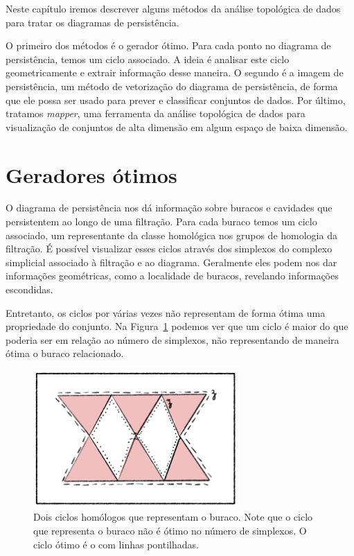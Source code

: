Neste capítulo iremos descrever alguns métodos da análise topológica de dados
para tratar os diagramas de persistência. 

O primeiro dos métodos é o
gerador ótimo. Para cada ponto no diagrama de persistência, temos um ciclo
associado. A ideia é analisar este ciclo geometricamente e extrair 
informação desse maneira. 
O segundo é a imagem de persistência, um método de vetorização do diagrama de 
persistência, de forma que ele possa ser usado para prever e classificar 
conjuntos de dados. 
Por último, tratamos \textit{mapper}, uma ferramenta da análise topológica 
de dados para visualização de conjuntos de alta dimensão em algum 
espaço de baixa dimensão. 

\section{Geradores ótimos}
O diagrama de persistência nos dá informação sobre buracos e cavidades que
persistentem ao longo de uma filtração. Para cada buraco temos um ciclo
associado, um representante da classe homológica nos grupos de homologia 
da filtração. É possível visualizar esses ciclos através dos simplexos do
complexo simplicial associado à filtração e ao diagrama. Geralmente eles 
podem nos dar informações geométricas, como a localidade de buracos, 
revelando informações escondidas. 

Entretanto, os ciclos por várias vezes não representam de forma ótima
uma propriedade do conjunto. Na Figura~\ref{fig:nonoptcyc} podemos
ver que um ciclo é maior do que poderia ser em relação ao número
de simplexos, não representando de maneira ótima o buraco relacionado. 
\begin{figure}\label{fig:nonoptimal}
    \centering
    \includegraphics[width=0.7\textwidth]{images/nonoptcyc.png}
    \caption{Dois ciclos homólogos que representam o buraco. Note que o ciclo
            que representa o buraco não é ótimo no número de simplexos. O ciclo
            ótimo é o com linhas pontilhadas.}
    \label{fig:nonoptcyc}
    \fautor
\end{figure} 

